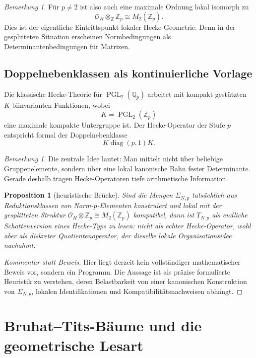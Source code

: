 \documentclass[12pt,a4paper]{article}
\newcommand{\PGL}{\operatorname{PGL}}
\newcommand{\diag}{\operatorname{diag}}
\theoremstyle{plain}
\newtheorem{proposition}[satz]{Proposition}
\theoremstyle{definition}
\theoremstyle{remark}
\newtheorem{bemerkung}[satz]{Bemerkung}
\newcommand{\Q}{\mathbb{Q}}
\newcommand{\Z}{\mathbb{Z}}
\newcommand{\OH}{\mathcal{O}_H}
\begin{document}
	\begin{bemerkung}
		Für \(p\neq 2\) ist also auch eine maximale Ordnung lokal isomorph zu
		\[
		\OH\otimes_\Z \Z_p \cong M_2(\Z_p).
		\]
		Dies ist der eigentliche Eintrittspunkt lokaler Hecke-Geometrie.
		Denn in der gesplitteten Situation erscheinen Normbedingungen als
		Determinantenbedingungen für Matrizen.
	\end{bemerkung}
	
	\subsection{Doppelnebenklassen als kontinuierliche Vorlage}
	
	Die klassische Hecke-Theorie für \(\PGL_2(\Q_p)\) arbeitet mit
	kompakt gestützten \(K\)-biinvarianten Funktionen,
	wobei
	\[
	K = \PGL_2(\Z_p)
	\]
	eine maximale kompakte Untergruppe ist.
	Der Hecke-Operator der Stufe \(p\) entspricht formal der Doppelnebenklasse
	\[
	K \diag(p,1) K.
	\]
	
	\begin{bemerkung}
		Die zentrale Idee lautet: Man mittelt nicht über beliebige Gruppenelemente,
		sondern über eine lokal kanonische Bahn fester Determinante.
		Gerade deshalb tragen Hecke-Operatoren tiefe arithmetische Information.
	\end{bemerkung}
	
	\begin{proposition}[heuristische Brücke]
		Sind die Mengen \(\Sigma_{N,p}\) tatsächlich aus Reduktionsklassen
		von Norm-\(p\)-Elementen konstruiert und lokal mit der gesplitteten Struktur
		\(\OH\otimes \Z_p \cong M_2(\Z_p)\) kompatibel, dann ist \(T_{N,p}\)
		als endliche Schattenversion eines Hecke-Typs zu lesen:
		nicht als echter Hecke-Operator, wohl aber als diskreter Quotientenoperator,
		der dieselbe lokale Organisationsidee nachahmt.
	\end{proposition}
	
	\begin{proof}[Kommentar statt Beweis]
		Hier liegt derzeit kein vollständiger mathematischer Beweis vor,
		sondern ein Programm.
		Die Aussage ist als präzise formulierte Heuristik zu verstehen,
		deren Belastbarkeit von einer kanonischen Konstruktion von \(\Sigma_{N,p}\),
		lokalen Identifikationen und Kompatibilitätsnachweisen abhängt.
	\end{proof}
	
	\section{Bruhat--Tits-Bäume und die geometrische Lesart}
	
\end{document}
